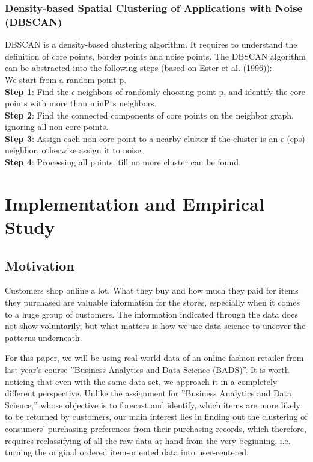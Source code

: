 \documentclass[a4paper,12pt,fleqn]{article}
\begin{document}
\subsubsection{Density-based Spatial Clustering of Applications with Noise (DBSCAN)}%
DBSCAN is a density-based clustering algorithm. It requires to understand the definition of core points, border points and noise points. The DBSCAN algorithm can be abstracted into the following steps (based on Ester et al. (1996)):\\
We start from a random point p.\\
\textbf{Step 1}: Find the $\epsilon$ neighbors of randomly choosing point p, and identify the core points with more than minPts neighbors.\\
\textbf{Step 2}: Find the connected components of core points on the neighbor graph, ignoring all non-core points.\\
\textbf{Step 3}: Assign each non-core point to a nearby cluster if the cluster is an $\epsilon$ (eps) neighbor, otherwise assign it to noise.\\
\textbf{Step 4}: Processing all points, till no more cluster can be found.\\


\newpage
\section{Implementation and Empirical Study}
\subsection{Motivation}
Customers shop online a lot. What they buy and how much they paid for items they purchased are valuable information for the stores, especially when it comes to a huge group of customers. The information indicated through the data does not show voluntarily, but what matters is how we use data science to uncover the patterns underneath.

For this paper, we will be using real-world data of an online fashion retailer from last year's course ''Business Analytics and Data Science (BADS)''. It is worth noticing that even with the same data set, we approach it in a completely different perspective. Unlike the assignment for ''Business Analytics and Data Science,'' whose objective is to forecast and identify, which items are more likely to be returned by customers, our main interest lies in finding out the clustering of consumers' purchasing preferences from their purchasing records, which therefore, requires reclassifying of all the raw data at hand from the very beginning, i.e. turning the original ordered item-oriented data into user-centered.
\end{document}
